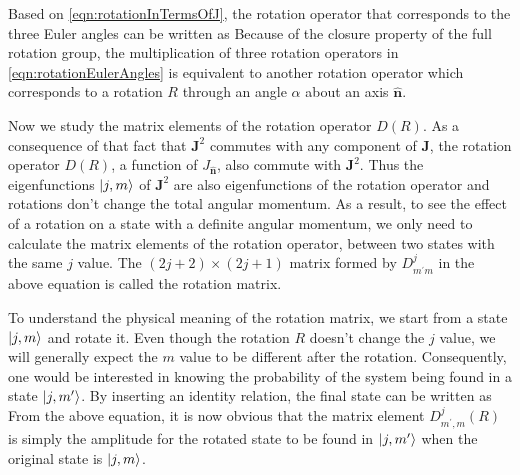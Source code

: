 Based on \autoref{eqn:rotationInTermsOfJ}, the rotation operator that corresponds to the three Euler angles can be 
written as
Because of the closure property of the full rotation group, the multiplication of three rotation operators in 
\autoref{eqn:rotationEulerAngles} is equivalent to another rotation operator
which corresponds to a rotation $R$  through an angle $\alpha$ about an axis $\mathbf{\hat{n}}$. 

Now we study the 
matrix elements of the rotation operator $D(R)$. As a consequence of that fact that $\mathbf{J}^2$ commutes with 
any component of $\mathbf{J}$,  the rotation operator $D(R)$, a function of $J_{\mathbf{\hat{n}}}$, also commute
with $\mathbf{J}^2$. Thus the eigenfunctions $| j, m \rangle$ of $\mathbf{J}^2$ are also eigenfunctions of the rotation
operator and rotations don't change the total angular momentum. 
As a result, to see the effect of a rotation on a state with a definite angular momentum, we only need to calculate the
 matrix elements of the rotation operator, 
between two states with the same $j$ value. 
The $(2 j + 2) \times (2 j + 1)$ matrix formed by $D^{j}_{m^{\prime} m}$ in the above equation is called the rotation
matrix.  

To understand the physical meaning of the rotation matrix, we start from a state $| j, m \rangle$ and rotate it. Even though
the rotation $R$ doesn't change the $j$ value, we will generally expect the $m$ value to be different after the rotation. 
Consequently, one would be interested in knowing the probability of the system being found in a state $| j, m^{\prime} \rangle$. By inserting an identity relation, the final state can be written as
From the above equation, it is now obvious that the matrix element $D^{j}_{m^{\prime}, m}(R)$ is simply the amplitude for the rotated state to
be found in $| j, m^{\prime} \rangle$ when the original state is $| j, m \rangle$. 



